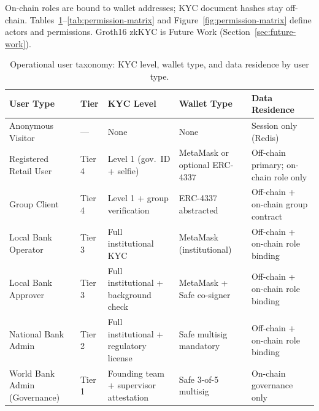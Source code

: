 \documentclass[12pt,a4paper]{report}
\newcommand{\tableheadcolor}{\rowcolor{TableHeadBg}}
\begin{document}
\noindent On-chain roles are bound to wallet addresses; KYC document hashes stay off-chain. Tables~\ref{tab:user-taxonomy}--\ref{tab:permission-matrix} and Figure~\ref{fig:permission-matrix} define actors and permissions. Groth16 zkKYC is Future Work (Section~\ref{sec:future-work}).

\begin{table}[H]
\centering
\caption[Operational user taxonomy]{Operational user taxonomy: KYC level, wallet type, and data residence by user type.}
\label{tab:user-taxonomy}
\begin{tabular}{p{3.1cm}p{1.4cm}p{2.6cm}p{2.4cm}p{3.4cm}}
\toprule
\tableheadcolor
\textbf{User Type} & \textbf{Tier} & \textbf{KYC Level} & \textbf{Wallet Type} & \textbf{Data Residence} \\
\midrule
Anonymous Visitor & --- & None & None & Session only (Redis) \\
Registered Retail User & Tier 4 & Level 1 (gov.\ ID + selfie) & MetaMask or optional ERC-4337 & Off-chain primary; on-chain role only \\
Group Client & Tier 4 & Level 1 + group verification & ERC-4337 abstracted & Off-chain + on-chain group contract \\
Local Bank Operator & Tier 3 & Full institutional KYC & MetaMask (institutional) & Off-chain + on-chain role binding \\
Local Bank Approver & Tier 3 & Full institutional + background check & MetaMask + Safe co-signer & Off-chain + on-chain role binding \\
National Bank Admin & Tier 2 & Full institutional + regulatory license & Safe multisig mandatory & Off-chain + on-chain role binding \\
World Bank Admin (Governance) & Tier 1 & Founding team + supervisor attestation & Safe 3-of-5 multisig & On-chain governance only \\
\bottomrule
\end{tabular}
\end{table}
\end{document}

